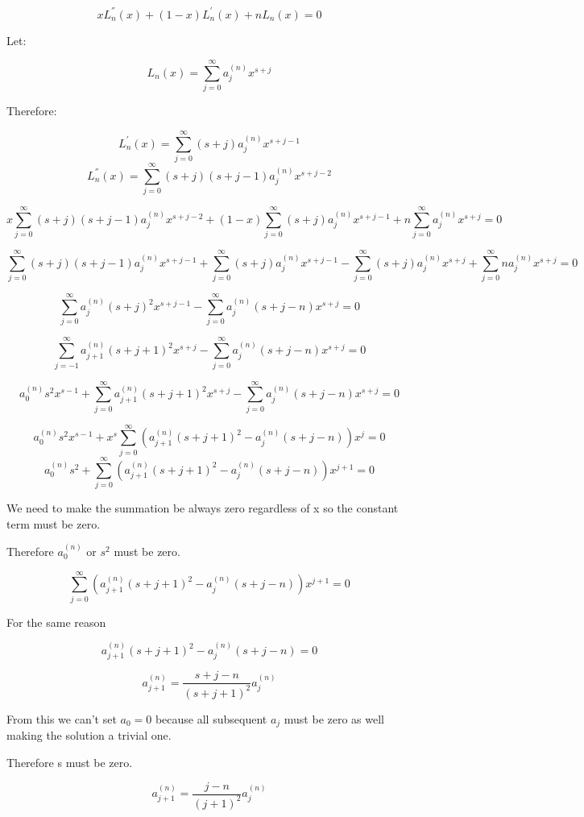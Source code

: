 \documentclass[12pt]{article}
\begin{document}
\[x L^{''}_n(x) + (1-x) L^{'}_n(x) + n L_n(x) = 0\]

Let:

\[L_n(x)=\sum_{j = 0}^{\infty} a_j^{(n)} x^{s+j} \]

Therefore:

\[L^{'}_n(x)=\sum_{j = 0}^{\infty} (s+j)a_j^{(n)} x^{s+j-1} \]
\[L^{''}_n(x)=\sum_{j = 0}^{\infty} (s+j)(s+j-1)a_j^{(n)} x^{s+j-2} \]

\[x \sum_{j = 0}^{\infty} (s+j)(s+j-1)a_j^{(n)} x^{s+j-2} + (1-x) \sum_{j = 0}^{\infty} (s+j)a_j^{(n)} x^{s+j-1} + n \sum_{j = 0}^{\infty} a_j^{(n)} x^{s+j} = 0\]

\[\sum_{j = 0}^{\infty} (s+j)(s+j-1)a_j^{(n)} x^{s+j-1} + \sum_{j = 0}^{\infty} (s+j)a_j^{(n)} x^{s+j-1} - \sum_{j = 0}^{\infty} (s+j)a_j^{(n)} x^{s+j} + \sum_{j = 0}^{\infty} n a_j^{(n)} x^{s+j} = 0\]

\[\sum_{j = 0}^{\infty} a_j^{(n)} {(s+j)}^2 x^{s+j-1} - \sum_{j = 0}^{\infty} a_j^{(n)} (s+j-n) x^{s+j} = 0\]

\[\sum_{j = -1}^{\infty} a_{j+1}^{(n)} {(s+j+1)}^2 x^{s+j} - \sum_{j = 0}^{\infty} a_j^{(n)} (s+j-n) x^{s+j} = 0\]

\[a_{0}^{(n)} s^2 x^{s-1} + \sum_{j = 0}^{\infty} a_{j+1}^{(n)} {(s+j+1)}^2 x^{s+j} - \sum_{j = 0}^{\infty} a_j^{(n)} (s+j-n) x^{s+j} = 0\]

\[a_{0}^{(n)} s^2 x^{s-1} +  x^{s} \sum_{j = 0}^{\infty} (a_{j+1}^{(n)} {(s+j+1)}^2 - a_j^{(n)} (s+j-n)) x^{j} = 0\]
\[a_{0}^{(n)} s^2 + \sum_{j = 0}^{\infty} \left(a_{j+1}^{(n)} {(s+j+1)}^2 - a_j^{(n)} (s+j-n)\right) x^{j + 1} = 0\]

We need to make the summation be always zero regardless of x so the constant term must be zero.

Therefore $a_{0}^{(n)}$ or $s^2$ must be zero.

\[\sum_{j = 0}^{\infty} \left(a_{j+1}^{(n)} {(s+j+1)}^2 - a_j^{(n)} (s+j-n)\right) x^{j + 1} = 0\]

For the same reason

\[a_{j+1}^{(n)} {(s+j+1)}^2 - a_j^{(n)} (s+j-n) = 0\]

\[a_{j+1}^{(n)} = \frac{s+j-n}{{(s+j+1)}^2}a_j^{(n)}\]

From this we can't set $a_0 = 0$ because all subsequent $a_j$ must be zero as well making the solution a trivial one.

Therefore s must be zero.

\[a_{j+1}^{(n)} = \frac{j-n}{{(j+1)}^2}a_j^{(n)}\]
\end{document}
